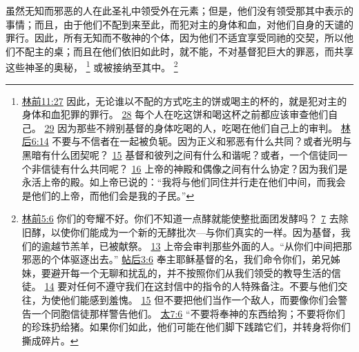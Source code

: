 \documentclass[12pt, a4paper, oneside]{ctexart}
\newcounter{parnum}[section]
\newcommand{\N}{%
   \noindent\refstepcounter{parnum}%
    \makebox[\parindent][l]{\textbf{\arabic{parnum}.}}}
\begin{document}
\N 虽然无知而邪恶的人在此圣礼中领受外在元素；但是，他们没有领受那其中表示的事情；而且，由于他们不配到来至此，而犯对主的身体和血，对他们自身的天谴的罪行。因此，所有无知而不敬神的个体，因为他们不适宜享受同祂的交契，所以他们不配主的桌；而且在他们依旧如此时，就不能，不对基督犯巨大的罪恶，而共享这些神圣的奥秘，
	\footnote {
		\href{https://biblehub.com/1_corinthians/11-27.htm}{林前11:27} 因此，无论谁以不配的方式吃主的饼或喝主的杯的，就是犯对主的身体和血犯罪的罪行。
		\href{https://biblehub.com/1_corinthians/11-28.htm}{28} 每个人在吃这饼和喝这杯之前都应该审查他们自己。
		\href{https://biblehub.com/1_corinthians/11-29.htm}{29} 因为那些不辨别基督的身体吃喝的人，吃喝在他们自己上的审判。
		\href{https://biblehub.com/2_corinthians/6-14.htm}{林后6:14} 不要与不信者在一起被负轭。因为正义和邪恶有什么共同？或者光明与黑暗有什么团契呢？
		\href{https://biblehub.com/2_corinthians/6-15.htm}{15} 基督和彼列之间有什么和谐呢？或者，一个信徒同一个非信徒有什么共同呢？
		\href{https://biblehub.com/2_corinthians/6-16.htm}{16} 上帝的神殿和偶像之间有什么协定？因为我们是永活上帝的殿。如上帝已说的：“我将与他们同住并行走在他们中间，而我会是他们的上帝，而他们会是我的子民。”
	}
	或被接纳至其中。
	\footnote {
		\href{https://biblehub.com/1_corinthians/5-6.htm}{林前5:6} 你们的夸耀不好。你们不知道一点酵就能使整批面团发酵吗？
		\href{https://biblehub.com/1_corinthians/5-7.htm}{7} 去除旧酵，以使你们能成为一个新的无酵批次---与你们真实的一样。因为基督，我们的逾越节羔羊，已被献祭。
		\href{https://biblehub.com/1_corinthians/5-13.htm}{13} 上帝会审判那些外面的人。“从你们中间把那邪恶的个体驱逐出去。”
		\href{https://biblehub.com/2_thessalonians/3-6.htm}{帖后3:6} 奉主耶稣基督的名，我们命令你们，弟兄姊妹，要避开每一个无聊和扰乱的，并不按照你们从我们领受的教导生活的信徒。
		\href{https://biblehub.com/2_thessalonians/3-14.htm}{14} 要对任何不遵守我们在这封信中的指令的人特殊备注。不要与他们交往，为使他们能感到羞愧。
		\href{https://biblehub.com/2_thessalonians/3-15.htm}{15} 但不要把他们当作一个敌人，而要像你们会警告一个同胞信徒那样警告他们。
		\href{https://biblehub.com/matthew/7-6.htm}{太7:6} “不要将奉神的东西给狗；不要将你们的珍珠扔给猪。如果你们如此，他们可能在他们脚下践踏它们，并转身将你们撕成碎片。
	}
\end{document}
